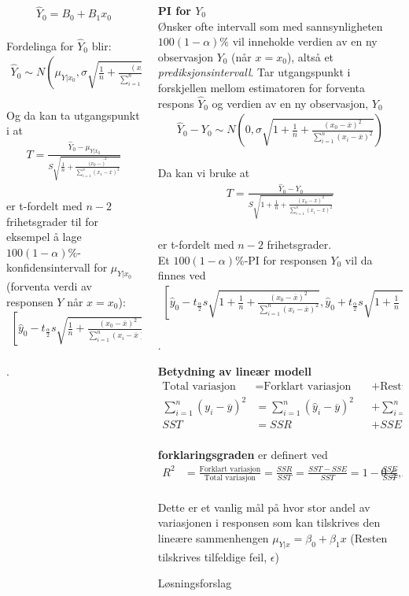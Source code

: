 \documentclass[final,hyperref={pdfpagelabels=false}]{beamer}
\newcommand{\maths}[1]{\vspace{-3mm}\begin{align*}#1\end{align*}\\\vspace{-3mm}}
\newcommand{\ol}[0]{\overline}
\newcommand{\tema}[2]{\footnotesize\raggedright\textbf{#1}\\{#2}\par}
\begin{document}
\begin{frame}{}
\begin{columns}[t]
\begin{column}{.33\linewidth}
\begin{block}{}
{					\maths{\hat Y_0=B_0+B_1x_0}
					Fordelinga for $\hat Y_0$ blir:
					\maths{\hat Y_0 \sim N\left(\mu_{Y|x_0},\sigma\sqrt{\frac{1}{n}+\frac{(x_0-\ol x)^2}{\sum_{i=1}^n(x_i-\ol x)^2}}\right)}
					Og da kan ta utgangspunkt i at
					\maths{T=\frac{\hat Y_0-\mu_{Y|x_0}}{S\sqrt{\frac{1}{n}+\frac{(x_0-\ol)^2}{\sum_{i=1}^n(x_1-\ol x)^2}}}}
					er t-fordelt med $n-2$ frihetsgrader til for eksempel å lage $100(1-\alpha)\%$-konfidensintervall for $\mu_{Y|x_0}$ (forventa verdi av responsen $Y$ når $x=x_0$):
					\maths{\left[\hat y_0 - t_{\frac{\alpha}{2}}s\sqrt{\frac{1}{n}+\frac{(x_0-\ol x)^2}{\sum_{i=1}^n(x_i - \ol x)^2}},\hat y_0 + t_{\frac{\alpha}{2}}s\sqrt{\frac{1}{n}+\frac{(x_0-\ol x)^2}{\sum_{i=1}^n(x_i - \ol x)^2}}\right]}.}
			\end{block}
		\end{column}
		\begin{column}{.33\linewidth}
				\tema{PI for $Y_0$}
				{Ønsker ofte intervall som med sannsynligheten $100(1-\alpha)\%$ vil inneholde verdien av en ny observasjon $Y_0$ (når $x=x_0$), altså et \textit{prediksjonsintervall}. Tar utgangspunkt i forskjellen mellom estimatoren for forventa respons $\hat Y_0$ og verdien av en ny observasjon, $Y_0$
					\maths{\hat Y_0 - Y_0 \sim N\left(0,\sigma\sqrt{1+\frac{1}{n}+\frac{(x_0-\ol x)^2}{\sum_{i=1}^n(x_i-\ol x)^2}}\right)}
					Da kan vi bruke at
					\maths{T=\frac{\hat Y_0-Y_0}{S\sqrt{1+\frac{1}{n}+\frac{(x_0-\ol x)^2}{\sum_{i=1}^n(x_i-\ol x)^2}}}}
					er t-fordelt med $n-2$ frihetsgrader.\\
					Et $100(1-\alpha)\%$-PI for responsen $Y_0$ vil da finnes ved
					\maths{\left[\hat y_0-t_\frac{\alpha}{2}s\sqrt{1+\frac{1}{n}+\frac{(x_0-\ol x)^2}{\sum_{i=1}^n(x_i-\ol x)^2}},\hat y_0+t_\frac{\alpha}{2}s\sqrt{1+\frac{1}{n}+\frac{(x_0-\ol x)^2}{\sum_{i=1}^n(x_i-\ol x)^2}}\right]}.
				}
				\tema{Betydning av lineær modell}
				{\maths{\text{Total variasjon}&=\text{Forklart variasjon}&&+\text{Restvariasjon}\\
						\sum_{i=1}^n(y_i-\ol y)^2&=\sum_{i=1}^n(\hat y_i-\ol y)^2 &&+ \sum_{i=1}^n (y_i-\hat y_i)^2\\
						SST&=SSR&&+SSE}
					\textbf{forklaringsgraden} er definert ved
					\maths{R^2&=\frac{\text{Forklart variasjon}}{\text{Total variasjon}}=\frac{SSR}{SST}=\frac{SST-SSE}{SST}=1-\frac{SSE}{SST}, &0 \leq R^2 \leq 1}
					Dette er et vanlig mål på hvor stor andel av variasjonen i responsen som kan tilskrives den lineære sammenhengen $\mu_{Y|x}=\beta_0+\beta_1 x$ (Resten tilskrives tilfeldige feil, $\epsilon$)}
				\begin{block}{Løsningsforslag}

\end{block}
\end{column}
\end{columns}
\end{frame}
\end{document}
